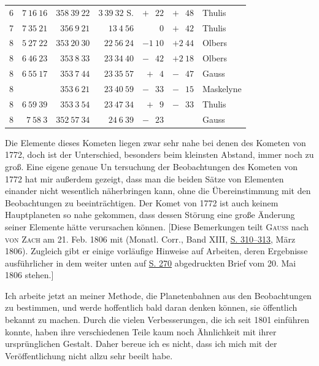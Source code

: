 \begin{center}
\begin{tabular}{r|r|r|r|r|r|l}
6 & $7\ 16\ 16$ & $358\ 39\ 22$ & $3\ 39\ 32$ S. & $+\phantom{1}\ 22$ & $+\phantom{1}\ 48$ & Thulis\\
7 & $7\ 35\ 21$ & $356\ 9\ 21$ & $13\ 4\ 56$ & $\phantom{+1}\ 0$ & $+\phantom{1}\ 42$ & Thulis\\
8 & $5\ 27\ 22$ & $353\ 20\ 30$ & $22\ 56\ 24$ & $-1\ 10$ & $+2\ 44$ & Olbers\\
8 & $6\ 46\ 23$ & $353\ 8\ 33$ & $23\ 34\ 40$ & $-\phantom{1}\ 42$ & $+2\ 18$ & Olbers\\
8 & $6\ 55\ 17$ & $353\ 7\ 44$ & $23\ 35\ 57$ & $+\phantom{1}\ 4$ & $-\phantom{1}\ 47$ & Gauss\\
8 & & $353\ 6\ 21$ & $23\ 40\ 59$ & $-\phantom{1}\ 33$ & $-\phantom{1}\ 15$ & Maskelyne\\
8 & $6\ 59\ 39$ & $353\ 3\ 54$ & $23\ 47\ 34$ & $+\phantom{1}\ 9$ & $-\phantom{1}\ 33$ & Thulis\\
8 & $7\ 58\ 3$ & $352\ 57\ 34$ & $24\ 6\ 39$ & $-\phantom{1}\ 23$ & & Gauss\\
\end{tabular}\endgroup
\end{center}

\par\indent Die Elemente dieses Kometen liegen zwar sehr nahe bei denen des Kometen von 1772, doch ist der Unterschied, besonders beim kleinsten Abstand, immer noch zu groß. Eine eigene genaue Un%
%
tersuchung der Beobachtungen des Kometen von 1772 hat mir außerdem gezeigt, dass man die beiden Sätze von Elementen einander nicht wesentlich näherbringen kann, ohne die Übereinstimmung mit den Beobachtungen zu beeinträchtigen. Der Komet von 1772 ist auch keinem Hauptplaneten so nahe gekommen, dass dessen Störung eine große Änderung seiner Elemente hätte verursachen können. [Diese Bemerkungen teilt \textsc{Gauss} nach \textsc{von Zach} am 21. Feb. 1806 mit (Monatl. Corr., Band XIII, \href{https://www.digitale-sammlungen.de/en/view/bsb10538605?page=320}{S. 310–313}, März 1806). Zugleich gibt er einige vorläufige Hinweise auf Arbeiten, deren Ergebnisse ausführlicher in dem weiter unten auf \hyperlink{native-275-lower}{S. 270} abgedruckten Brief vom 20. Mai 1806 stehen.]

\par\indent Ich arbeite jetzt an meiner Methode, die Planetenbahnen aus den Beobachtungen zu bestimmen, und werde hoffentlich bald daran denken können, sie öffentlich bekannt zu machen. Durch die vielen Verbesserungen, die ich seit 1801 einführen konnte, haben ihre verschiedenen Teile kaum noch Ähnlichkeit mit ihrer ursprünglichen Gestalt. Daher bereue ich es nicht, dass ich mich mit der Veröffentlichung nicht allzu sehr beeilt habe.

